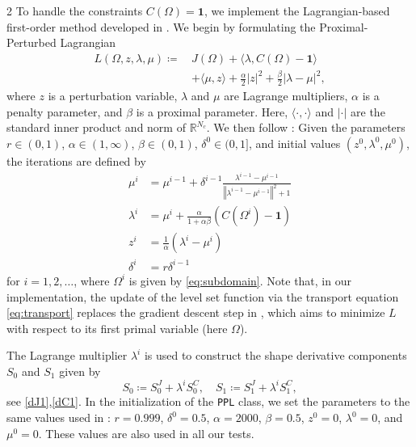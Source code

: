 \documentclass[a4paper, oneside]{article}
\newcommand{\code}[1]{\texttt{#1}}
\begin{document}
\begin{multicols}{2}
To handle the constraints $C(\Omega)=\boldsymbol{1}$,
we implement the Lagrangian-based first-order method developed in \cite{MR4589221}.
We begin by formulating the Proximal-Perturbed Lagrangian
\begin{equation} \label{eq:lagrangian}
\begin{aligned}
L(\Omega, z, \lambda, \mu) \coloneqq\,
& J(\Omega) + \langle \lambda, C(\Omega) -  \boldsymbol{1} \rangle \\
&+ \langle \mu, z \rangle + \frac{\alpha}{2} \vert z \vert^2 + \frac{\beta}{2} \vert \lambda - \mu \vert^2,
\end{aligned}
\end{equation}
where $z$ is a perturbation variable,
$\lambda$ and $\mu$ are Lagrange multipliers,
$\alpha$ is a penalty parameter, and
$\beta$ is a proximal parameter.
Here, $\langle \cdot, \cdot \rangle$ and $\vert \cdot \vert$
are the standard inner product and norm of $\mathds{R}^{N_c}$.
We then follow \cite[Algorithm~1]{MR4589221}:
Given the parameters 
$r\in(0,1)$,
$\alpha\in(1,\infty)$, $\beta\in(0,1)$, 
$\delta^{0}\in(0,1]$, and initial values
$(z^{0},\lambda^{0},\mu^{0})$,
the iterations are defined by
\begin{equation} \label{eq:lag_method}
\begin{aligned}
\mu^{i} & = \mu^{i-1}+\delta^{i-1}\tfrac{\lambda^{i-1}-\mu^{i-1}}{\left\Vert \lambda^{i-1}-\mu^{i-1} \right\Vert^{2} + 1}\\
\lambda^{i} & = \mu^{i} + \tfrac{\alpha}{1+\alpha \beta} (C(\Omega^{i})- \boldsymbol{1})\\
z^{i} & = \tfrac{1}{\alpha}(\lambda^{i}-\mu^{i})\\
\delta^{i} & =r\delta^{i-1}
\end{aligned}
\end{equation}
for $i=1,2,\dots$, where $\Omega^{i}$ is given by \eqref{eq:subdomain}.
Note that, in our implementation,
the update of the level set function via the transport equation \eqref{eq:transport}
replaces the gradient descent step in \cite[Algorithm~1]{MR4589221},
which aims to minimize $L$ with respect to its first primal variable (here $\Omega$).

The Lagrange multiplier $\lambda^i$ is used to construct
the shape derivative components
$S_0$ and $S_1$ given by
\begin{equation} \label{eq:S0andS1}
S_0 \coloneqq S_0^{J} + \lambda^{i} S_0^{C}, \quad S_1 \coloneqq S_1^{J} + \lambda^{i} S_1^{C}, 	
\end{equation}
see \eqref{dJ1},\eqref{dC1}.
In the initialization of the \code{PPL} class,
we set the parameters to the same values used in \cite{MR4589221}:
$r = 0.999$, $\delta^{0} = 0.5$,
$\alpha = 2000$, $\beta = 0.5$,
$z^{0} = 0$, $\lambda^{0} = 0$, and $\mu^{0} = 0$.
These values are also used in all our tests.


\end{multicols}
\end{document}

